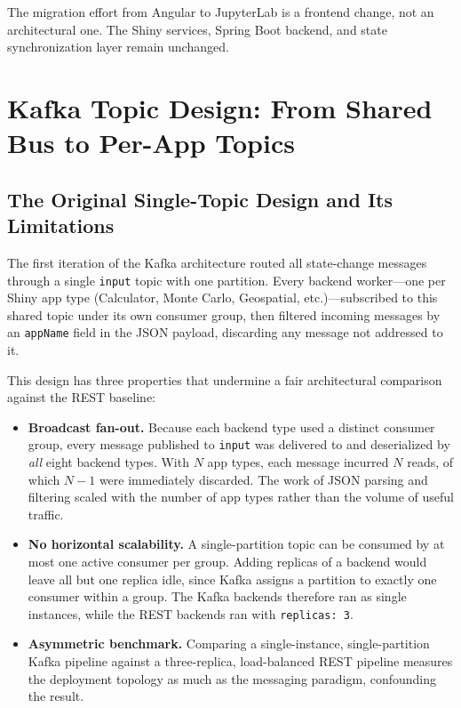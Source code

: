 \documentclass[11pt,a4paper]{article}
\begin{document}
The migration effort from Angular to JupyterLab is a frontend change,
not an architectural one. The Shiny services, Spring Boot backend, and
state synchronization layer remain unchanged.

\section{Kafka Topic Design: From Shared Bus to Per-App Topics}
\label{sec:kafka-topic-redesign}

\subsection{The Original Single-Topic Design and Its Limitations}

The first iteration of the Kafka architecture routed all state-change
messages through a single \texttt{input} topic with one partition.
Every backend worker---one per Shiny app type (Calculator, Monte Carlo,
Geospatial, etc.)---subscribed to this shared topic under its own
consumer group, then filtered incoming messages by an \texttt{appName}
field in the JSON payload, discarding any message not addressed to it.

This design has three properties that undermine a fair architectural
comparison against the REST baseline:

\begin{itemize}
  \item \textbf{Broadcast fan-out.} Because each backend type used a
        distinct consumer group, every message published to
        \texttt{input} was delivered to and deserialized by \emph{all}
        eight backend types. With $N$ app types, each message incurred
        $N$ reads, of which $N{-}1$ were immediately discarded. The work
        of JSON parsing and filtering scaled with the number of app
        types rather than the volume of useful traffic.
  \item \textbf{No horizontal scalability.} A single-partition topic can
        be consumed by at most one active consumer per group. Adding
        replicas of a backend would leave all but one replica idle, since
        Kafka assigns a partition to exactly one consumer within a group.
        The Kafka backends therefore ran as single instances, while the
        REST backends ran with \texttt{replicas: 3}.
  \item \textbf{Asymmetric benchmark.} Comparing a single-instance,
        single-partition Kafka pipeline against a three-replica,
        load-balanced REST pipeline measures the deployment topology as
        much as the messaging paradigm, confounding the result.
\end{itemize}
\end{document}
